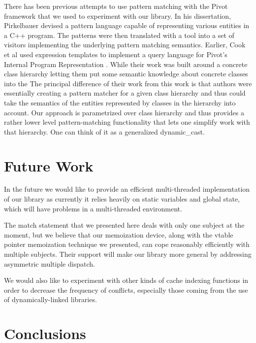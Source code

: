 \documentclass[preprint]{sigplanconf}
\begin{document}
There has been previous attempts to use pattern matching with the Pivot 
framework that we used to experiment with our library. In his dissertation, 
Pirkelbauer devised a pattern language capable of representing various entities 
in a C++ program. The patterns were then translated with a tool into a set of 
visitors implementing the underlying pattern matching 
semantics\cite{PirkelbauerThesis}. Earlier, Cook et al used expression templates 
to implement a query language for Pivot's Internal Program Representation 
\cite{iql04}. While their work was built around a concrete class hierarchy 
letting them put some semantic knowledge about concrete classes into the 
The principal difference of their work from this work is that 
authors were essentially creating a pattern matcher for a given class hierarchy 
and thus could take the semantics of the entities represented by classes in the 
hierarchy into account. Our approach is parametrized over class hierarchy and 
thus provides a rather lower level pattern-matching functionality that lets one 
simplify work with that hierarchy.  One can think of it as a generalized 
dynamic\_cast.

\section{Future Work} %
\label{sec:fw}

In the future we would like to provide an efficient multi-threaded 
implementation of our library as currently it relies heavily on static variables 
and global state, which will have problems in a multi-threaded environment. 

The match statement that we presented here deals with only one subject at the 
moment, but we believe that our memoization device, along with the vtable pointer memoization 
technique we presented, can cope reasonably efficiently with multiple subjects. 
Their support will make our library more general by addressing asymmetric 
multiple dispatch.

We would also like to experiment with other kinds of cache indexing functions in 
order to decrease the frequency of conflicts, especially those coming from the use 
of dynamically-linked libraries.

\section{Conclusions} %
\label{sec:cc}
\end{document}
